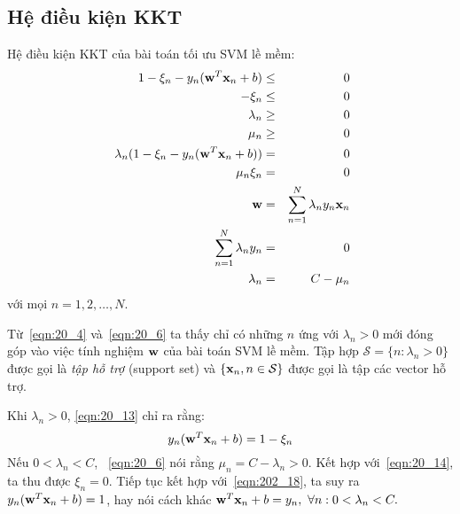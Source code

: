 \subsection{Hệ điều kiện KKT}

Hệ điều kiện KKT của bài toán tối ưu SVM lề mềm:
\begin{eqnarray}
\label{eqn:20_9}
1 - \xi_n - y_n(\mathbf{w}^T\mathbf{x}_n + b) &\leq& 0  \\\
\label{eqn:20_10}
-\xi_n &\leq& 0 \\\
\label{eqn:20_11}
\lambda_n &\geq& 0 \\\
\label{eqn:20_12}
\mu_n &\geq & 0 \\\
\label{eqn:20_13}
\lambda_n ( 1 - \xi_n - y_n(\mathbf{w}^T\mathbf{x}_n + b)) &=& 0 \\\
\label{eqn:20_14}
\mu_n \xi_n &=& 0 \\\
\setcounter{equation}{6}
\label{eqn:20_4}
\mathbf{w} &=& \sum_{n=1}^N \lambda_n y_n \mathbf{x}_n \\\
\sum_{n=1}^N \lambda_n y_n &=& 0 \\\
\label{eqn:20_6}
\lambda_n &=& C - \mu_n
\end{eqnarray}
với
mọi $n = 1, 2, \dots, N$.

Từ~\eqref{eqn:20_4} và~\eqref{eqn:20_6} ta thấy chỉ có những $n$ ứng với $\lambda_n > 0$ mới đóng
góp
vào việc tính nghiệm $\mathbf{w}$ của bài toán SVM lề mềm. Tập hợp $\mathcal{S} = \{n: \lambda_n > 0\}$
được gọi là \textit{tập hỗ trợ} (support set) và $\{\mathbf{x}_n, n \in \mathcal{S}\}$ được gọi là
tập các vector hỗ trợ.
\setcounter{equation}{17}

\def\NM{N_{\mathcal{M}}}
Khi $\lambda_n > 0$, \eqref{eqn:20_13} chỉ ra rằng:
\begin{equation}
\label{eqn:202_18}
y_n(\mathbf{w}^T\mathbf{x}_n + b) = 1 - \xi_n
\end{equation}
Nếu $0<\lambda_n < C$, ~\eqref{eqn:20_6} nói rằng $\mu_n = C
- \lambda_n > 0$. Kết hợp với~\eqref{eqn:20_14}, ta thu được $\xi_n = 0$. Tiếp
tục kết hợp với~\eqref{eqn:202_18}, ta suy ra $y_n(\mathbf{w}^T\mathbf{x}_n + b) = 1$, hay nói
cách khác
\begin{math}
\mathbf{w}^T\mathbf{x}_n + b = y_n, ~\forall n: 0 < \lambda_n < C.
\end{math}

